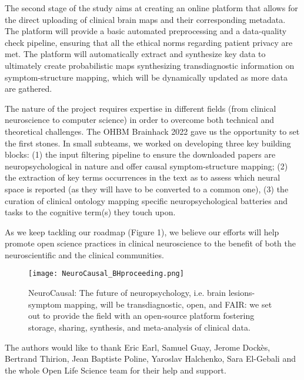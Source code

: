 \documentclass[../main.tex]{subfiles}
\begin{document}
The second stage of the study aims at creating an online platform that allows for the direct uploading of clinical brain maps and their corresponding metadata. The platform will provide a basic automated preprocessing and a data-quality check pipeline, ensuring that all the ethical norms regarding patient privacy are met. The platform will automatically extract and synthesize key data to ultimately create probabilistic maps synthesizing transdiagnostic information on symptom-structure mapping, which will be dynamically updated as more data are gathered.

The nature of the project requires expertise in different fields (from clinical neuroscience to computer science) in order to overcome both technical and theoretical challenges. The OHBM Brainhack 2022 gave us the opportunity to set the first stones. In small subteams, we worked on developing three key building blocks: (1) the input filtering pipeline to ensure the downloaded papers are neuropsychological in nature and offer causal symptom-structure mapping; (2) the extraction of key terms occurrences in the text as to assess which neural space is reported (as they will have to be converted to a common one), (3) the curation of clinical ontology mapping specific neuropsychological batteries and tasks to the cognitive term(s) they touch upon.

As we keep tackling our roadmap (Figure 1), we believe our efforts will help promote open science practices in clinical neuroscience to the benefit of both the neuroscientific and the clinical communities.


\begin{figure}
	\centering
	\texttt{[image: NeuroCausal\_BHproceeding.png]}
	\caption{NeuroCausal: The future of neuropsychology, i.e. brain lesions-symptom mapping, will be transdiagnostic, open, and FAIR: we set out to provide the field with an open-source platform fostering storage, sharing, synthesis, and meta-analysis of clinical data.
}
	\label{fig:NeuroCausal}
\end{figure}

 The authors would like to thank Eric Earl, Samuel Guay, Jerome Dockès, Bertrand Thirion, Jean Baptiste Poline, Yaroslav Halchenko, Sara El-Gebali and the whole Open Life Science team for their help and support.
\end{document}
